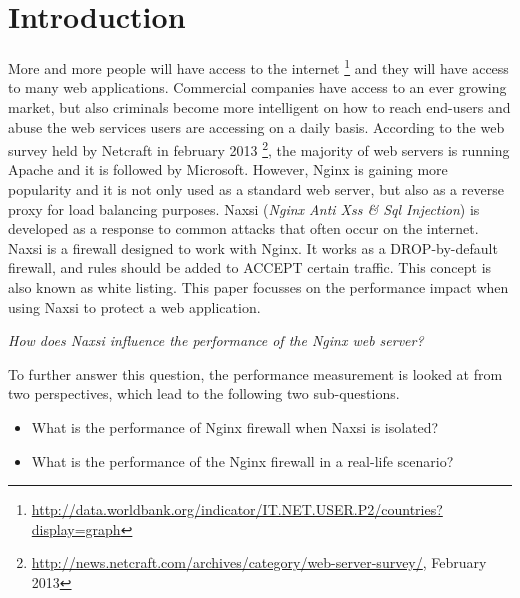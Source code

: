 \documentclass[Introduction]{subfiles}
\begin{document}
\section{Introduction}
\label{sec:Introduction}
More and more people will have access to the internet \footnote{\url{http://data.worldbank.org/indicator/IT.NET.USER.P2/countries?display=graph}} and they will have access to many web applications. Commercial companies have access to an ever growing market, but also criminals become more intelligent on how to reach end-users and abuse the web services users are accessing on a daily basis.
According to the web survey held by Netcraft in february 2013 \footnote{\url{http://news.netcraft.com/archives/category/web-server-survey/}, February 2013}, the majority of web servers is running Apache and it is followed by Microsoft. However, Nginx is gaining more popularity and it is not only used as a standard web server, but also as a reverse proxy for load balancing purposes. Naxsi (\emph{Nginx Anti Xss \& Sql Injection}) is developed as a response to common attacks that often occur on the internet. Naxsi is a firewall designed to work with Nginx. It works as a DROP-by-default firewall, and rules should be added to ACCEPT certain traffic. This concept is also known as white listing. This paper focusses on the performance impact when using Naxsi to protect a web application. 

\begin{center}
\emph{How does Naxsi influence the performance of the Nginx web server?} 
\end{center}

To further answer this question, the performance measurement is looked at from two perspectives, which lead to the following two sub-questions.

\begin{itemize}
\item What is the performance of Nginx firewall
when Naxsi is isolated?
\item What is the performance of the Nginx firewall in a real-life scenario?
\end{itemize}

\end{document}
